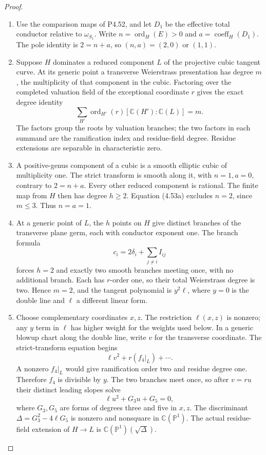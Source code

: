 \begin{proof}

\begin{enumerate}[label={$\langle1\rangle$\arabic*.},leftmargin=*]
\item Use the comparison maps of P4.52, and let $D_1$ be the
effective total conductor relative to $\omega_{S_1}$.
Write $n=\operatorname{ord}_H(E)>0$ and
$a=\operatorname{coeff}_H(D_1)$. The pole identity is
$2=n+a$, so $(n,a)=(2,0)$ or $(1,1)$.

\item Suppose $H$ dominates a reduced component $L$ of the
projective cubic tangent curve. At its generic point
a transverse Weierstrass presentation has degree
$m$, the multiplicity of that component in the cubic.
Factoring over the completed valuation field of the
exceptional coordinate $r$ gives the exact degree
identity
\[
 \sum_{H'}\operatorname{ord}_{H'}(r)
                 [\mathbb C(H'):\mathbb C(L)]=m.             \tag{4.53a}
\]
The factors group the roots by valuation branches;
the two factors in each summand are the ramification
index and residue-field degree. Residue extensions
are separable in characteristic zero.

\item A positive-genus component of a cubic is a smooth
elliptic cubic of multiplicity one. The strict
transform is smooth along it, with $n=1,a=0$,
contrary to $2=n+a$. Every other reduced component
is rational. The finite map from $H$ then has degree
$h\ge2$. Equation (4.53a) excludes $n=2$, since
$m\le3$. Thus $n=a=1$.

\item At a generic point of $L$, the $h$ points on $H$
give distinct branches of the transverse plane germ,
each with conductor exponent one. The branch formula
\[
             c_i=2\delta_i+\sum_{j\ne i}I_{ij}
\]
forces $h=2$ and exactly two smooth branches meeting
once, with no additional branch. Each has $r$-order
one, so their total Weierstrass degree is two. Hence
$m=2$, and the tangent polynomial is $y^2\ell$,
where $y=0$ is the double line and $\ell$ a different
linear form.

\item Choose complementary coordinates $x,z$. The
restriction $\ell(x,z)$ is nonzero; any $y$ term in
$\ell$ has higher weight for the weights used below.
In a generic blowup chart along the double line,
write $v$ for the transverse coordinate. The
strict-transform equation begins
\[
                 \ell v^2+r(f_4|_L)+\cdots.
\]
A nonzero $f_4|_L$ would give ramification order two
and residue degree one. Therefore $f_4$ is divisible
by $y$. The two branches meet once, so after
$v=ru$ their distinct leading slopes solve
\[
                         \ell u^2+G_3u+G_5=0,
\]
where $G_3,G_5$ are forms of degrees three and five
in $x,z$. The discriminant
$\Delta=G_3^2-4\ell G_5$ is nonzero and nonsquare
in $\mathbb C(\mathbb P^1)$. The actual residue-field
extension of $H\to L$ is
$\mathbb C(\mathbb P^1)(\sqrt\Delta)$.


\end{enumerate}
\end{proof}
